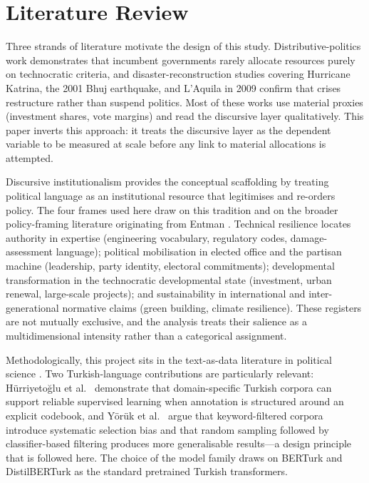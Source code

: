 \documentclass[12pt, journal]{IEEEtran}
\begin{document}
\section{Literature Review}
Three strands of literature motivate the design of this study. Distributive-politics work \cite{cox1986electoral, dixit1996determinants} demonstrates that incumbent governments rarely allocate resources purely on technocratic criteria, and disaster-reconstruction studies covering Hurricane Katrina, the 2001 Bhuj earthquake, and L'Aquila in 2009 confirm that crises restructure rather than suspend politics. Most of these works use material proxies (investment shares, vote margins) and read the discursive layer qualitatively. This paper inverts this approach: it treats the discursive layer as the dependent variable to be measured at scale before any link to material allocations is attempted.

Discursive institutionalism \cite{schmidt2008discursive, schmidt2010taking} provides the conceptual scaffolding by treating political language as an institutional resource that legitimises and re-orders policy. The four frames used here draw on this tradition and on the broader policy-framing literature originating from Entman \cite{entman1993framing}. Technical resilience locates authority in expertise (engineering vocabulary, regulatory codes, damage-assessment language); political mobilisation in elected office and the partisan machine (leadership, party identity, electoral commitments); developmental transformation in the technocratic developmental state (investment, urban renewal, large-scale projects); and sustainability in international and inter-generational normative claims (green building, climate resilience). These registers are not mutually exclusive, and the analysis treats their salience as a multidimensional intensity rather than a categorical assignment.

Methodologically, this project sits in the text-as-data literature in political science \cite{grimmer2013text, grimmer2022text}. Two Turkish-language contributions are particularly relevant: H\"urriyeto\u{g}lu et al.~\cite{hurriyetoglu2020cross} demonstrate that domain-specific Turkish corpora can support reliable supervised learning when annotation is structured around an explicit codebook, and Y\"or\"uk et al.~\cite{yoruk2022random} argue that keyword-filtered corpora introduce systematic selection bias and that random sampling followed by classifier-based filtering produces more generalisable results---a design principle that is followed here. The choice of the model family draws on BERTurk and DistilBERTurk \cite{schweter2020berturk} as the standard pretrained Turkish transformers.
\end{document}
